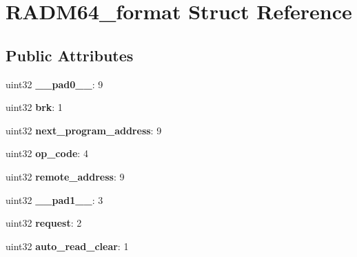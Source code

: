 \hypertarget{structRADM64__format}{}\section{R\+A\+D\+M64\+\_\+format Struct Reference}
\label{structRADM64__format}
\subsection*{Public Attributes}
\begin{DoxyCompactItemize}
\item 
\mbox{\label{structRADM64__format_a712d402788fa7f8bb1cd164c2a31cab0}} 
uint32 {\bfseries \+\_\+\+\_\+pad0\+\_\+\+\_\+}\+: 9
\item 
\mbox{\label{structRADM64__format_a27fff5064dd122084d038ac7555e15f9}} 
uint32 {\bfseries brk}\+: 1
\item 
\mbox{\label{structRADM64__format_acf84537d206fb7699022652a0218fc5a}} 
uint32 {\bfseries next\+\_\+program\+\_\+address}\+: 9
\item 
\mbox{\label{structRADM64__format_aeb216e62e70cdbb6006499074287dfef}} 
uint32 {\bfseries op\+\_\+code}\+: 4
\item 
\mbox{\label{structRADM64__format_acb68299737149c434481ece58af35710}} 
uint32 {\bfseries remote\+\_\+address}\+: 9
\item 
\mbox{\label{structRADM64__format_a3fe9896c85be4b99c4248567765ad4c7}} 
uint32 {\bfseries \+\_\+\+\_\+pad1\+\_\+\+\_\+}\+: 3
\item 
\mbox{\label{structRADM64__format_ab91f68136e64fceacb213b1bef123894}} 
uint32 {\bfseries request}\+: 2
\item 
\mbox{\label{structRADM64__format_a43d706be3d0190e4fb251fec98e9232d}} 
uint32 {\bfseries auto\+\_\+read\+\_\+clear}\+: 1
\item 
\mbox{\label{structRADM64__format_ae3eb3ccc959cac3cc52282267d475d68}} 

\end{DoxyCompactItemize}
